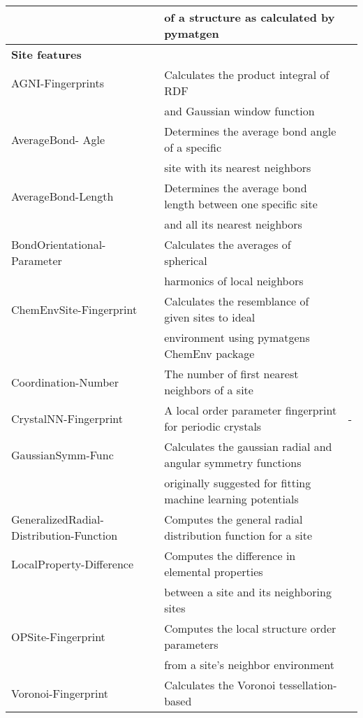 \begin{center}
\begin{longtable}{M{3.5cm} M{6.5cm} M{2.0cm}}
   &of a structure as calculated by pymatgen  & \\ 
    \hline 
  \textbf{Site features} & & \\
  AGNI-Fingerprints & Calculates the product integral of RDF & \cite{Botu2014}  \\    
   & and Gaussian window function  & \\ 
  AverageBond- Agle & Determines the average bond angle of a specific  & \cite{Jong2016}  \\
   & site with its nearest neighbors  & \\ 
  AverageBond-Length & Determines the average bond length between one specific site & \cite{Jong2016}  \\ 
   & and all its nearest neighbors  & \\ 
  BondOrientational-Parameter & Calculates the averages of spherical  & \cite{Seko2017, Steinhardt1983}  \\ 
   & harmonics of local neighbors & \\ 
  ChemEnvSite-Fingerprint & Calculates the resemblance of given sites to ideal & \cite{Waroquiers2017, Zimmermann2017}  \\   
   & environment using pymatgens ChemEnv package  & \\ 
  Coordination-Number & The number of first nearest neighbors of a site & \cite{Zimmermann2017}  \\
  CrystalNN-Fingerprint & A local order parameter fingerprint for periodic crystals & -  \\   
  GaussianSymm-Func & Calculates the gaussian radial and angular symmetry functions  & \cite{Behler2011,Khorshidi2016}  \\   
   & originally suggested for fitting machine learning potentials &  \\ 
  GeneralizedRadial-Distribution-Function & Computes the general radial distribution function for a site & \cite{Seko2017}  \\   
  LocalProperty-Difference & Computes the difference in elemental properties  & \cite{Ward2017, Jong2016} \\   
   & between a site and its neighboring sites & \\ 
  OPSite-Fingerprint & Computes the local structure order parameters & \cite{Zimmermann2017} \\   
   & from a site's neighbor environment  & \\ 
  Voronoi-Fingerprint & Calculates the Voronoi tessellation-based  & \cite{Peng2011,Wang2019} \\

\end{longtable}
\end{center}
